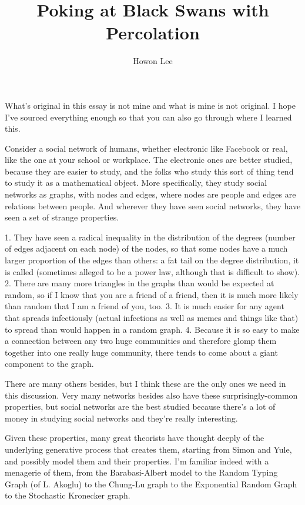 \documentclass[12pt]{article}
\begin{document}
\title{Poking at Black Swans with Percolation}
\author{Howon Lee}
\maketitle

What's original in this essay is not mine and what is mine is not original. I hope I've sourced everything enough so that you can also go through where I learned this.

Consider a social network of humans, whether electronic like Facebook or real, like the one at your school or workplace. The electronic ones are better studied, because they are easier to study, and the folks who study this sort of thing tend to study it as a mathematical object. More specifically, they study social networks as graphs, with nodes and edges, where nodes are people and edges are relations between people. And wherever they have seen social networks, they have seen a set of strange properties. 

1. They have seen a radical inequality in the distribution of the degrees (number of edges adjacent on each node) of the nodes, so that some nodes have a much larger proportion of the edges than others: a fat tail on the degree distribution, it is called (sometimes alleged to be a power law, although that is difficult to show).
2. There are many more triangles in the graphs than would be expected at random, so if I know that you are a friend of a friend, then it is much more likely than random that I am a friend of you, too.
3. It is much easier for any agent that spreads infectiously (actual infections as well as memes and things like that) to spread than would happen in a random graph.
4. Because it is so easy to make a connection between any two huge communities and therefore glomp them together into one really huge community, there tends to come about a giant component to the graph.

There are many others besides, but I think these are the only ones we need in this discussion. Very many networks besides also have these surprisingly-common properties, but social networks are the best studied because there's a lot of money in studying social networks and they're really interesting.

Given these properties, many great theorists have thought deeply of the underlying generative process that creates them, starting from Simon and Yule, and possibly model them and their properties. I'm familiar indeed with a menagerie of them, from the Barabasi-Albert model to the Random Typing Graph (of L. Akoglu) to the Chung-Lu graph to the Exponential Random Graph to the Stochastic Kronecker graph.
\end{document}
